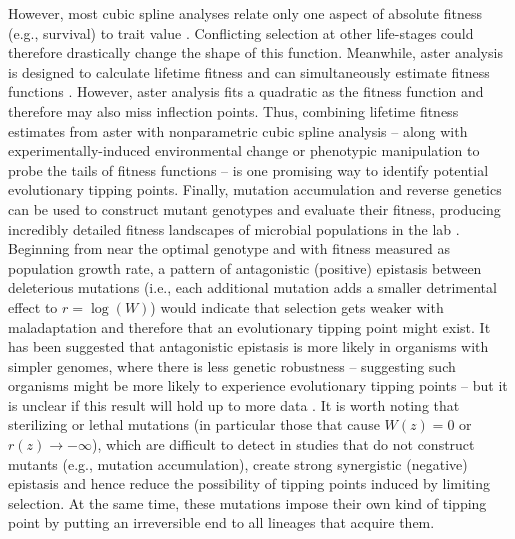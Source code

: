 \documentclass[12pt,letterpaper]{article} %
\begin{document}
However, most cubic spline analyses relate only one aspect of absolute fitness (e.g., survival) to trait value \citep[e.g., Figure 4 in][]{Reimchen2002}.
Conflicting selection at other life-stages \citep[e.g.,][]{Robinson2006} could therefore drastically change the shape of this function.
Meanwhile, aster analysis is designed to calculate lifetime fitness and can simultaneously estimate fitness functions \citep[e.g., Figure A2 in][]{Shaw2008}.
However, aster analysis fits a quadratic as the fitness function \citep[parametric bootstrap on a scaled measure of fitness;][]{Shaw2008} and therefore may also miss inflection points.
Thus, combining lifetime fitness estimates from aster with nonparametric cubic spline analysis --  along with experimentally-induced environmental change \citep[e.g.,][]{Weis2014} or phenotypic manipulation \citep[e.g.,][]{Sinervo1992,Simons2009} to probe the tails of fitness functions --  is one promising way to identify potential evolutionary tipping points.
Finally, mutation accumulation and reverse genetics can be used to construct mutant genotypes and evaluate their fitness, producing incredibly detailed fitness landscapes of microbial populations in the lab \citep[e.g., Figure 2 in][]{Bank2016}.
Beginning from near the optimal genotype and with fitness measured as population growth rate, a pattern of antagonistic (positive) epistasis between deleterious mutations (i.e., each additional mutation adds a smaller detrimental effect to $r=\log(W)$) would indicate that selection gets weaker with maladaptation and therefore that an evolutionary tipping point might exist.
It has been suggested that antagonistic epistasis is more likely in organisms with simpler genomes, where there is less genetic robustness \citep[][]{Sanjuan2006} -- suggesting such organisms might be more likely to experience evolutionary tipping points -- but it is unclear if this result will hold up to more data \citep{Agrawal2010}.
It is worth noting that sterilizing or lethal mutations (in particular those that cause $W(z)=0$ or $r(z)\rightarrow-\infty$), which are difficult to detect in studies that do not construct mutants (e.g., mutation accumulation), create strong synergistic (negative) epistasis \citep[e.g.,][]{Lalic2012} and hence reduce the possibility of tipping points induced by limiting selection.
At the same time, these mutations impose their own kind of tipping point by putting an irreversible end to all lineages that acquire them. 
\end{document}
